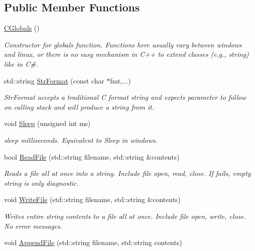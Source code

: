 \subsection*{Public Member Functions}
\begin{DoxyCompactItemize}
\item 
\hyperlink{classCGlobals_a5b9dfa617380bb74856a39f519445fc5}{C\-Globals} ()
\begin{DoxyCompactList}\small\item\em Constructor for globals function. Functions here usually vary between windows and linux, or there is no easy mechanism in C++ to extend classes (e.\-g., string) like in C\#. \end{DoxyCompactList}\item 
std\-::string \hyperlink{classCGlobals_ab08bfe830833f153fcd15e1eadb05287}{Str\-Format} (const char $\ast$fmt,...)
\begin{DoxyCompactList}\small\item\em Str\-Format accepts a traditional C format string and expects parameter to follow on calling stack and will produce a string from it. \end{DoxyCompactList}\item 
void \hyperlink{classCGlobals_a5d120cec7b57ee16fca7fc9398c67d61}{Sleep} (unsigned int ms)
\begin{DoxyCompactList}\small\item\em sleep milliseconds. Equivalent to Sleep in windows. \end{DoxyCompactList}\item 
bool \hyperlink{classCGlobals_ac1722817e9b2e73b2daa73ef40179cef}{Read\-File} (std\-::string filename, std\-::string \&contents)
\begin{DoxyCompactList}\small\item\em Reads a file all at once into a string. Include file open, read, close. If fails, empty string is only diagnostic. \end{DoxyCompactList}\item 
void \hyperlink{classCGlobals_aaba4dc868620e6714f96339f873db4d6}{Write\-File} (std\-::string filename, std\-::string \&contents)
\begin{DoxyCompactList}\small\item\em Writes entire string contents to a file all at once. Include file open, write, close. No error messages. \end{DoxyCompactList}\item 
void \hyperlink{classCGlobals_a7876537cd390030c33daa30f43c2070c}{Append\-File} (std\-::string filename, std\-::string contents)

\end{DoxyCompactItemize}
